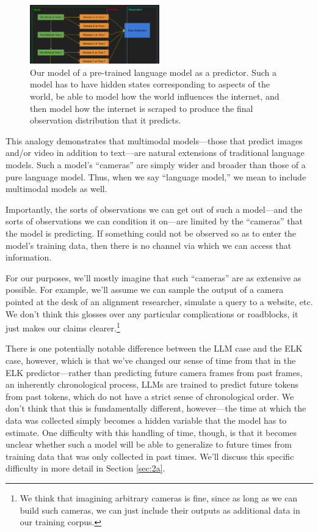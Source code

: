 \documentclass[
  twocolumn,
  natbib,
]{miri-tech-article}
\begin{document}
\begin{figure}[h!]
  \centering
  \includegraphics[width=0.5\textwidth]{Mj4z48A.png}
  \caption{Our model of a pre-trained language model as a predictor. Such a model has to have hidden states corresponding to aspects of the world, be able to model how the world influences the internet, and then model how the internet is scraped to produce the final observation distribution that it predicts.}
\end{figure}

This analogy demonstrates that multimodal models---those that predict images and/or video in addition to text---are natural extensions of traditional language models. Such a model's ``cameras'' are simply wider and broader than those of a pure language model. Thus, when we say ``language model,'' we mean to include multimodal models as well.

Importantly, the sorts of observations we can get out of such a model---and the sorts of observations we can condition it on---are limited by the ``cameras'' that the model is predicting. If something could not be observed so as to enter the model's training data, then there is no channel via which we can access that information.

For our purposes, we'll mostly imagine that such ``cameras'' are as extensive as possible. For example, we'll assume we can sample the output of a camera pointed at the desk of an alignment researcher, simulate a query to a website, etc. We don't think this glosses over any particular complications or roadblocks, it just makes our claims clearer.\footnote{We think that imagining arbitrary cameras is fine, since as long as we can build such cameras, we can just include their outputs as additional data in our training corpus.}

There is one potentially notable difference between the LLM case and the ELK case, however, which is that we've changed our sense of time from that in the ELK predictor---rather than predicting future camera frames from past frames, an inherently chronological process, LLMs are trained to predict future tokens from past tokens, which do not have a strict sense of chronological order. We don't think that this is fundamentally different, however---the time at which the data was collected simply becomes a hidden variable that the model has to estimate. One difficulty with this handling of time, though, is that it becomes unclear whether such a model will be able to generalize to future times from training data that was only collected in past times. We'll discuss this specific difficulty in more detail in Section \ref{sec:2a}.
\end{document}

